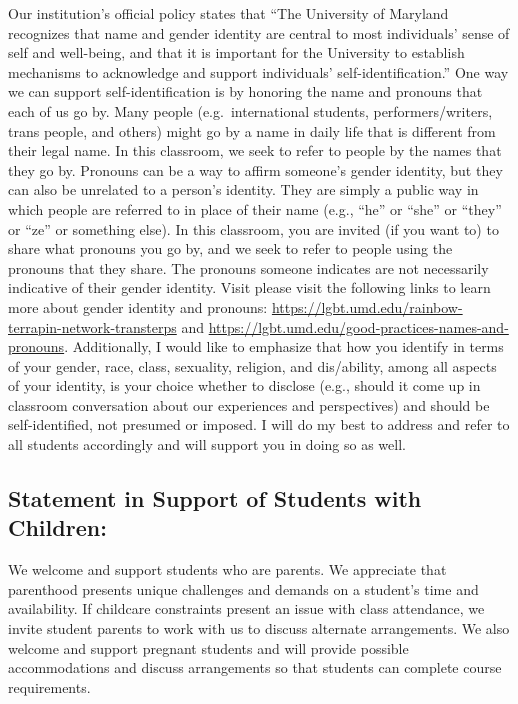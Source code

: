 \documentclass[
]{book}
\begin{document}
Our institution's official policy states that ``The University of Maryland recognizes that name and gender identity are central to most individuals' sense of self and well-being, and that it is important for the University to establish mechanisms to acknowledge and support individuals' self-identification.'' One way we can support self-identification is by honoring the name and pronouns that each of us go by. Many people (e.g.~international students, performers/writers, trans people, and others) might go by a name in daily life that is different from their legal name. In this classroom, we seek to refer to people by the names that they go by. Pronouns can be a way to affirm someone's gender identity, but they can also be unrelated to a person's identity. They are simply a public way in which people are referred to in place of their name (e.g., ``he'' or ``she'' or ``they'' or ``ze'' or something else). In this classroom, you are invited (if you want to) to share what pronouns you go by, and we seek to refer to people using the pronouns that they share. The pronouns someone indicates are not necessarily indicative of their gender identity. Visit please visit the following links to learn more about gender identity and pronouns: \url{https://lgbt.umd.edu/rainbow-terrapin-network-transterps} and \url{https://lgbt.umd.edu/good-practices-names-and-pronouns}. Additionally, I would like to emphasize that how you identify in terms of your gender, race, class, sexuality, religion, and dis/ability, among all aspects of your identity, is your choice whether to disclose (e.g., should it come up in classroom conversation about our experiences and perspectives) and should be self-identified, not presumed or imposed. I will do my best to address and refer to all students accordingly and will support you in doing so as well.

\hypertarget{statement-in-support-of-students-with-children}{%
\subsection{Statement in Support of Students with Children:}\label{statement-in-support-of-students-with-children}}

We welcome and support students who are parents. We appreciate that parenthood presents unique challenges and demands on a student's time and availability. If childcare constraints present an issue with class attendance, we invite student parents to work with us to discuss alternate arrangements. We also welcome and support pregnant students and will provide possible accommodations and discuss arrangements so that students can complete course requirements.
\end{document}
